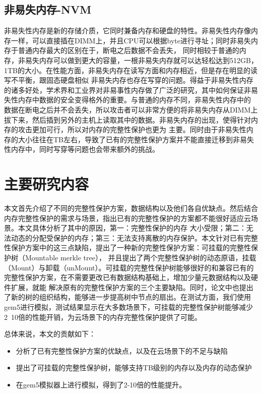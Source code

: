 \subsection{非易失内存-NVM}
非易失性内存是新的存储介质，它同时兼备内存和硬盘的特性。非易失性内存像内存一样，可以直接插在DIMM上，并且CPU可以根据byte进行寻址；同时非易失内存于普通内存最大的区别在于，断电之后数据不会丢失，
同时相较于普通的内存，非易失内存可以做到更大的容量，一根非易失内存就可以达轻松达到512GB，1TB的大小。在性能方面，非易失内存在读写方面和内存相近，但是存在明显的读写不平衡，跟固态硬盘相似
非易失内存也存在写穿的问题。得益于非易失性内存的诸多好处，学术界和工业界对非易事性内存做了广泛的研究，其中如何保证非易失性内存中数据的安全变得格外的重要。与普通的内存不同，非易失性内存中的
数据在断电之后并不会丢失，所以攻击者可以非常方便的将非易失内存从DIMM上拔下来，然后插到另外的主机上读取其中的数据。非易失内存的出现，使得针对内存的攻击更加可行，所以对内存的完整性保护也更为
主要。同时由于非易失性内存的大小往往在TB左右，导致了已有的完整性保护方案并不能直接迁移到非易失性内存中，同时写穿等问题也会带来额外的挑战。

\section{主要研究内容}
本文首先介绍了不同的完整性保护方案，数据结构以及他们各自优缺点。然后结合内存完整性保护的需求与场景，指出已有的完整性保护的方案都不能很好适应云场景。本文具体分析了其中的原因，第一：完整性保护的内存
大小受限；第二：无法动态的分配受保护的内存；第三：无法支持离散的内存保护。本文针对已有完整性保护方案中的这三点缺陷，提出了一种新的完整性保护方案：可挂载的完整性保护树（Mountable merkle tree），
并且提出了两个完整性保护树的动态原语，挂载（Mount）与卸载（unMount）。可挂载的完整性保护树能够很好的和兼容已有的完整性保护方案，在不需要更改已有数据结构基础上，增加少量元数据结构以及硬件扩展，就能
解决原有的完整性保护方案的三个主要缺陷。同时，论文中也提出了新的树的组织结构，能够进一步提高树中节点的扇出。在测试方面，我们使用gem5进行模拟，测试结果显示在大多数场景下，可挂载的完整性保护树能够减少
2~10倍的性能开销，为云场景下的内存完整性保护提供了可能。

总体来说，本文的贡献如下：
\begin{itemize}
    \item 分析了已有完整性保护方案的优缺点，以及在云场景下的不足与缺陷
    \item 提出了可挂载的完整性保护树，能够支持TB级别的内存以及内存的动态保护
    \item 在gem5模拟器上进行模拟，得到了2-10倍的性能提升。
\end{itemize}

